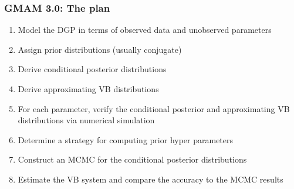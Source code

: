 \documentclass[10pt, compress]{beamer}
\begin{document}
\begin{frame}[fragile]
\frametitle{GMAM 3.0: The plan}
\begin{enumerate}
    \item Model the DGP in terms of observed data and unobserved parameters
    \item Assign prior distributions (usually conjugate)
    \item Derive conditional posterior distributions
    \item Derive approximating VB distributions
    \item For each parameter, verify the conditional posterior and approximating VB distributions via numerical simulation
    \item Determine a strategy for computing prior hyper parameters
    \item Construct an MCMC for the conditional posterior distributions
    \item Estimate the VB system and compare the accuracy to the MCMC results
\end{enumerate}
\end{frame}
\end{document}
